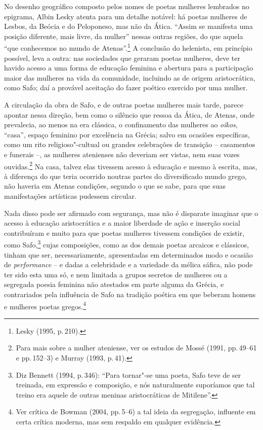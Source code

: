 No desenho geográfico composto pelos nomes de poetas mulheres
lembrados no epigrama, Albin Lesky atenta para um detalhe
notável: há poetas mulheres de Lesbos, da Beócia e do Peloponeso, mas não da
Ática. “Assim se manifesta uma posição diferente, mais livre, da mulher”
nessas outras regiões, do que aquela “que conhecemos no mundo de Atenas”.\footnote{ Lesky (1995, p.\,210).} A
conclusão do helenista, em princípio possível, leva a outra: nas sociedades
que geraram poetas mulheres, deve ter havido acesso a uma forma de educação
feminina e abertura para a participação maior das mulheres na vida da
comunidade, incluindo as de origem aristocrática, como Safo; daí a provável
aceitação do fazer poético exercido por uma mulher.

A circulação da obra de Safo, e de outras poetas mulheres mais tarde, parece
apontar nessa direção, bem como o silêncio que ressoa da Ática, de Atenas, onde
prevalecia, ao menos na era clássica, o confinamento das mulheres ao \textit{oîkos}, “casa”, espaço
feminino por excelência na Grécia; salvo em ocasiões específicas, como um rito
religioso"-cultual ou grandes celebrações de transição -- casamentos e funerais --, as mulheres atenienses não deveriam ser vistas, nem suas
vozes ouvidas.\footnote{ Para mais sobre a mulher ateniense, ver os estudos de
Mossé (1991, pp.\,49--61 e pp.\,152--3) e Murray (1993, p.\,41).} Na casa, talvez elas
tivessem acesso à educação e mesmo à escrita, mas, à diferença do que teria
ocorrido noutras partes do diversificado mundo grego, não haveria em Atenas
condições, segundo o que se sabe, para que suas manifestações artísticas
pudessem circular.

Nada disso pode ser afirmado com segurança, mas não é disparate imaginar que o acesso
à educação aristocrática e a maior liberdade de ação e inserção social
contribuíram e muito para que poetas mulheres tivessem condições de existir,
como Safo,\footnote{ Diz Bennett (1994, p.\,346):
“Para tornar"-se uma poeta, Safo teve de ser treinada, em expressão
e composição, e nós naturalmente suporíamos que tal treino era aquele de outras
meninas aristocráticas de Mitilene”.} cujas composições, como as dos demais
poetas arcaicos e clássicos, tinham que ser, necessariamente, apresentadas em
determinados modo e ocasião de \textit{performance} -- e dadas a celebridade e a variedade da mélica sáfica, não pode ter sido esta uma só, e nem limitada
a grupos secretos de mulheres ou a segregada poesia feminina não atestados em parte alguma da Grécia, e contrariados pela influência de Safo na tradição poética em que beberam homens e mulheres poetas gregos.\footnote{Ver crítica de Bowman (2004, pp.\,5--6) a tal ideia da segregação, influente em certa crítica moderna, mas sem respaldo em qualquer evidência.}

